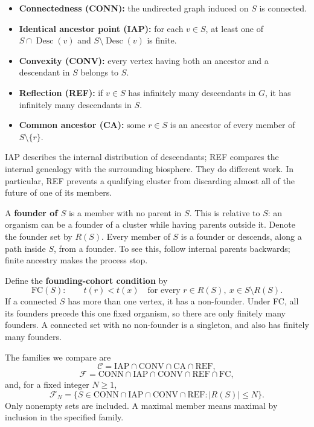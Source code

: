 \documentclass[
  11pt,
  letterpaper,
]{article}
\providecommand{\tightlist}{%
  \setlength{\itemsep}{0pt}\setlength{\parskip}{0pt}}
\begin{document}
\begin{itemize}
\tightlist
\item
  \textbf{Connectedness (CONN):} the undirected graph induced on \(S\)
  is connected.
\item
  \textbf{Identical ancestor point (IAP):} for each \(v\in S\), at least
  one of \(S\cap\operatorname{Desc}(v)\) and
  \(S\setminus\operatorname{Desc}(v)\) is finite.
\item
  \textbf{Convexity (CONV):} every vertex having both an ancestor and a
  descendant in \(S\) belongs to \(S\).
\item
  \textbf{Reflection (REF):} if \(v\in S\) has infinitely many
  descendants in \(G\), it has infinitely many descendants in \(S\).
\item
  \textbf{Common ancestor (CA):} some \(r\in S\) is an ancestor of every
  member of \(S\setminus\{r\}\).
\end{itemize}

IAP describes the internal distribution of descendants; REF compares the
internal genealogy with the surrounding biosphere. They do different
work. In particular, REF prevents a qualifying cluster from discarding
almost all of the future of one of its members.

A \textbf{founder of \(S\)} is a member with no parent in \(S\). This is
relative to \(S\): an organism can be a founder of a cluster while
having parents outside it. Denote the founder set by \(R(S)\). Every
member of \(S\) is a founder or descends, along a path inside \(S\),
from a founder. To see this, follow internal parents backwards; finite
ancestry makes the process stop.

Define the \textbf{founding-cohort condition} by \[
 \mathrm{FC}(S):\qquad
 t(r)<t(x)\quad
 \text{for every }r\in R(S),\ x\in S\setminus R(S).
\] If a connected \(S\) has more than one vertex, it has a non-founder.
Under FC, all its founders precede this one fixed organism, so there are
only finitely many founders. A connected set with no non-founder is a
singleton, and also has finitely many founders.

The families we compare are \[
 \mathcal C=\mathrm{IAP}\cap\mathrm{CONV}\cap\mathrm{CA}\cap\mathrm{REF},
\] \[
 \mathcal F=\mathrm{CONN}\cap\mathrm{IAP}\cap
             \mathrm{CONV}\cap\mathrm{REF}\cap\mathrm{FC},
\] and, for a fixed integer \(N\geq1\), \[
 \mathcal F_N=\{S\in\mathrm{CONN}\cap\mathrm{IAP}\cap
                   \mathrm{CONV}\cap\mathrm{REF}:|R(S)|\leq N\}.
\] Only nonempty sets are included. A maximal member means maximal by
inclusion in the specified family.
\end{document}
